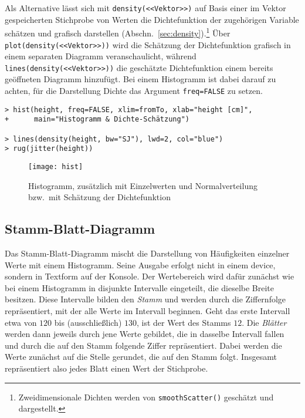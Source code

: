 Als Alternative lässt sich mit  \lstinline!density(<<Vektor>>)! auf Basis einer im Vektor gespeicherten Stichprobe von Werten die Dichtefunktion der zugehörigen Variable schätzen und grafisch darstellen (Abschn.\ \ref{sec:density}).\footnote{Zweidimensionale Dichten werden von  \lstinline!smoothScatter()! geschätzt und dargestellt.} Über \lstinline!plot(density(<<Vektor>>))! wird die Schätzung der Dichtefunktion grafisch in einem separaten Diagramm veranschaulicht, während \lstinline!lines(density(<<Vektor>>))! die geschätzte Dichtefunktion einem bereits geöffneten Diagramm hinzufügt. Bei einem Histogramm ist dabei darauf zu achten, für die Darstellung Dichte das Argument \lstinline!freq=FALSE! zu setzen.
\begin{lstlisting}
> hist(height, freq=FALSE, xlim=fromTo, xlab="height [cm]",
+      main="Histogramm & Dichte-Schätzung")

> lines(density(height, bw="SJ"), lwd=2, col="blue")
> rug(jitter(height))
\end{lstlisting}

\begin{figure}[ht]
\centering
\texttt{[image: hist]}
\vspace*{-1em}
\caption{Histogramm, zusätzlich mit Einzelwerten und Normalverteilung bzw.\ mit Schätzung der Dichtefunktion}
\label{fig:hist}
\end{figure}

\subsection{Stamm-Blatt-Diagramm}

Das Stamm-Blatt-Diagramm mischt die Darstellung von Häufigkeiten einzelner Werte mit einem Histogramm. Seine Ausgabe erfolgt nicht in einem device, sondern in Textform auf der Konsole. Der Wertebereich wird dafür zunächst wie bei einem Histogramm in disjunkte Intervalle eingeteilt, die dieselbe Breite besitzen. Diese Intervalle bilden den \emph{Stamm} und werden durch die Ziffernfolge repräsentiert, mit der alle Werte im Intervall beginnen. Geht das erste Intervall etwa von $120$ bis (ausschließlich) $130$, ist der Wert des Stamms $12$. Die \emph{Blätter} werden dann jeweils durch jene Werte gebildet, die in dasselbe Intervall fallen und durch die auf den Stamm folgende Ziffer repräsentiert. Dabei werden die Werte zunächst auf die Stelle gerundet, die auf den Stamm folgt. Insgesamt repräsentiert also jedes Blatt einen Wert der Stichprobe.

